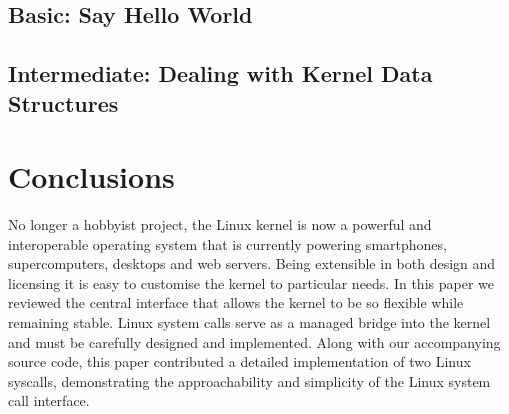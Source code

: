 \documentclass{article}
\begin{document}
  
\subsection{Basic: Say Hello World}
\lipsum[1]

\subsection{Intermediate: Dealing with Kernel Data Structures}
\lipsum[1]

\section{Conclusions}
No longer a hobbyist project,
the Linux kernel is now a powerful and interoperable operating system that is currently 
powering smartphones, supercomputers, desktops and web servers. 
Being extensible in both design and licensing it is easy 
to customise the kernel to particular needs. In this paper we reviewed 
the central interface that allows the kernel to be so flexible while remaining stable.
Linux system calls serve as a managed bridge into the kernel and must be carefully 
designed and implemented. Along with our accompanying source code, this paper
contributed a detailed implementation of two Linux syscalls,
demonstrating the approachability and simplicity of the Linux system call interface.



\vspace{-7.5mm}
\renewcommand{\refname}{\section{References}}

\end{document}
